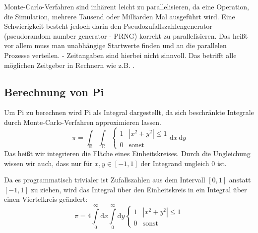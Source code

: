 Monte-Carlo-Verfahren sind inhärent leicht zu parallelisieren, da eine Operation, die Simulation, mehrere Tausend oder Milliarden Mal ausgeführt wird. Eine Schwierigkeit besteht jedoch darin den Pseudozufallszahlengenerator (pseudorandom number generator - PRNG) korrekt zu parallelisieren. Das heißt vor allem muss man unabhängige Startwerte finden und an die parallelen Prozesse verteilen.
 - Zeitangaben sind hierbei nicht sinnvoll. Das betrifft alle möglichen Zeitgeber in Rechnern wie z.B. .

 
\subsection{Berechnung von Pi}

Um Pi zu berechnen wird Pi als Integral dargestellt, da sich beschränkte Integrale durch Monte-Carlo-Verfahren approximieren lassen.
\begin{equation}
	\pi = \int_\mathbb{R} \int_\mathbb{R} \begin{cases}
					1 & |x^2+y^2| \leq 1\\
					0 & \text{sonst}
			   \end{cases}
		  \mathrm{d}x\,\mathrm{d}y
\end{equation}
Das heißt wir integrieren die Fläche eines Einheitskreises. Durch die Ungleichung wissen wir auch, dass nur für $x,y\in [-1,1]$ der Integrand ungleich $0$ ist.

Da es programmatisch trivialer ist Zufallszahlen aus dem Intervall $[0,1]$ anstatt $[-1,1]$ zu ziehen, wird das Integral über den Einheitskreis in ein Integral über einen Viertelkreis geändert:
\begin{equation}
	\label{eq:piint}
	\pi = 4 \int\limits_{0}^\infty \mathrm{d}x
		    \int\limits_{0}^\infty \mathrm{d}y
		    \begin{cases}1 & |x^2+y^2| \leq 1\\0 & \text{sonst} \end{cases}
\end{equation}


